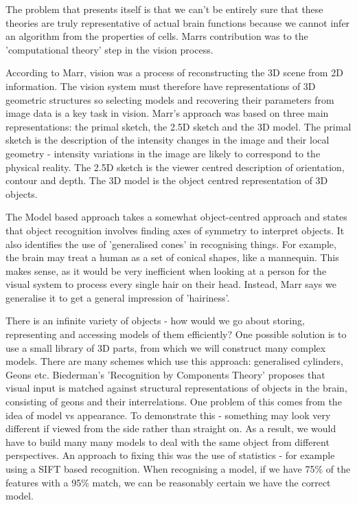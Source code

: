 \documentclass{article}
\begin{document}
	The problem that presents itself is that we can't be entirely sure that these theories are truly representative of actual brain functions because we cannot infer an algorithm from the properties of cells. Marrs contribution was to the 'computational theory' step in the vision process.
	
	\par 
	According to Marr, vision was a process of reconstructing the 3D scene from 2D information. The vision system must therefore have representations of 3D geometric structures so selecting models and recovering their parameters from image data is a key task in vision. Marr's approach was based on three main representations: the primal sketch, the 2.5D sketch and the 3D model. The primal sketch is the description of the intensity changes in the image and their local geometry - intensity variations in the image are likely to correspond to the physical reality. The 2.5D sketch is the viewer centred description of orientation, contour and depth. The 3D model is the object centred representation of 3D objects.
	
	\par 
	The Model based approach takes a somewhat object-centred approach and states that object recognition involves finding axes of symmetry to interpret objects. It also identifies the use of 'generalised cones' in recognising things. For example, the brain may treat a human as a set of conical shapes, like a mannequin. This makes sense, as it would be very inefficient when looking at a person for the visual system to process every single hair on their head. Instead, Marr says we generalise it to get a general impression of 'hairiness'.
	
	\par 
	There is an infinite variety of objects - how would we go about storing, representing and accessing models of them efficiently? One possible solution is to use a small library of 3D parts, from which we will construct many complex models. There are many schemes which use this approach: generalised cylinders, Geons etc. Biederman's 'Recognition by Components Theory' proposes that visual input is matched against structural representations of objects in the brain, consisting of geons and their interrelations. One problem of this comes from the idea of model vs appearance. To demonstrate this - something may look very different if viewed from the side rather than straight on. As a result, we would have to build many many models to deal with the same object from different perspectives. An approach to fixing this was the use of statistics - for example using a SIFT based recognition. When recognising a model, if we have 75\% of the features with a 95\% match, we can be reasonably certain we have the correct model.
	
\end{document}
